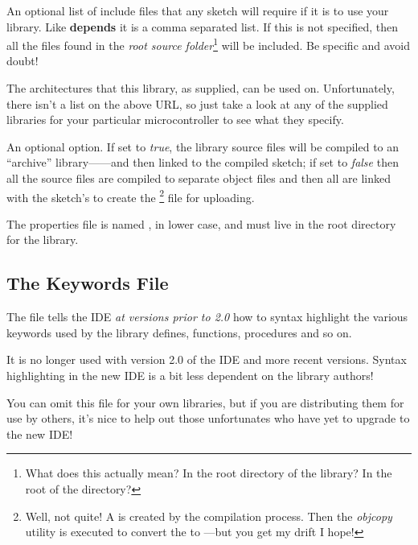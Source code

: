 \begin{description}
    \item[\textbf{includes}] An optional list of include files that any sketch will require if it is to use your library. Like \textbf{depends} it is a comma separated list. If this is not specified, then all the  files found in the \emph{root source folder}\footnote{What does this actually mean? In the root directory of the library? In the root of the  directory?} will be included. Be specific and avoid doubt!
    \item[\textbf{architectures}] The architectures that this library, as supplied, can be used on. Unfortunately, there isn't a list on the above URL, so just take a look at any of the supplied libraries for your particular microcontroller to see what they specify.
    \item[\textbf{dot\_a\_linkage}] An optional option. If set to \emph{true}, the library source files will be compiled to an ``archive'' library------and then linked to the compiled sketch; if set to \emph{false} then all the source files are compiled to separate  object files and then all are linked with the sketch's  to create the \footnote{Well, not quite! A  is created by the compilation process. Then the \emph{objcopy} utility is executed to convert the  to ---but you get my drift I hope!} file for uploading.
\end{description}

The properties file is named , in lower case, and must live in the root directory for the library.

\subsection{The Keywords File}

The  file tells the IDE \emph{at versions prior to 2.0} how to syntax highlight the various keywords used by the library defines, functions, procedures and so on.

It is no longer used with version 2.0 of the IDE and more recent versions. Syntax highlighting in the new IDE is a bit less dependent on the library authors!

You can omit this file for your own libraries, but if you are distributing them for use by others, it's nice to help out those unfortunates who have yet to upgrade to the new IDE!

